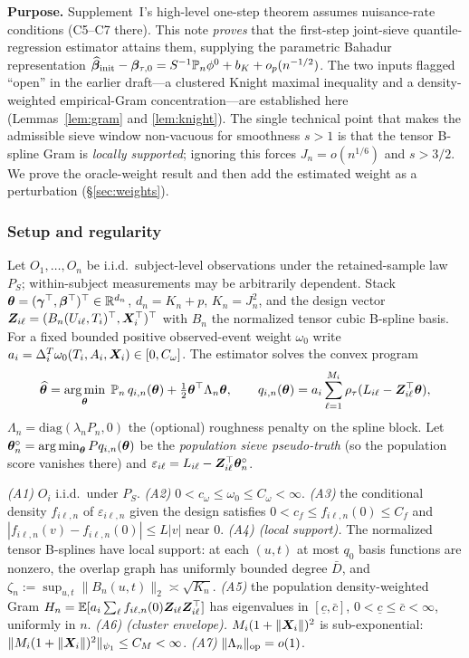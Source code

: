 

\noindent\textbf{Purpose.} Supplement~I's high-level one-step theorem assumes
nuisance-rate conditions (C5--C7 there). This note \emph{proves} that the
first-step joint-sieve quantile-regression estimator attains them, supplying the
parametric Bahadur representation $\widehat{\bm{\beta}}_{\rm init}-\bm{\beta}_{\tau,0}
=S^{-1}\mathbb{P}_n\phi^0+b_{K}+o_p(n^{-1/2})$. The two inputs flagged ``open'' in the
earlier draft---a clustered Knight maximal inequality and a density-weighted
empirical-Gram concentration---are established here (Lemmas~\ref{lem:gram} and
\ref{lem:knight}). The single technical point that makes the admissible sieve
window non-vacuous for smoothness $s>1$ is that the tensor B-spline Gram is
\emph{locally supported}; ignoring this forces $J_n=o(n^{1/6})$ and $s>3/2$.
We prove the oracle-weight result and then add the estimated weight as a
perturbation (\S\ref{sec:weights}).

\subsubsection{Setup and regularity}\label{sec:setup}
Let $O_1,\dots,O_n$ be i.i.d.\ subject-level observations under the
retained-sample law $P_S$; within-subject measurements may be arbitrarily
dependent. Stack $\bm{\theta}=(\bm{\gamma}^\top,\bm{\beta}^\top)^\top\in\mathbb R^{d_n}$,
$d_n=K_n+p$, $K_n=J_n^2$, and the design vector
$\bm{Z}_{i\ell}=(B_n(U_{i\ell},T_i)^\top,\bm{X}_i^\top)^\top$ with $B_n$ the normalized
tensor cubic B-spline basis. For a fixed bounded positive observed-event weight
$\omega_0$ write $a_i=\Delta_i^T\omega_0(T_i,A_i,\bm{X}_i)\in[0,C_\omega]$. The
estimator solves the convex program
\[
\widehat{\bm{\theta}}=\operatorname*{arg\,min}_{\bm{\theta}}\;\mathbb{P}_n\,q_{i,n}(\bm{\theta})+\tfrac12\bm{\theta}^\top\Lambda_n\bm{\theta},
\qquad q_{i,n}(\bm{\theta})=a_i\sum_{\ell=1}^{M_i}\rho_\tau(L_{i\ell}
-\bm{Z}_{i\ell}^\top\bm{\theta}),
\]
$\Lambda_n=\mathrm{diag}(\lambda_n P_n,0)$ the (optional) roughness penalty on the
spline block. Let $\bm{\theta}_n^\circ=\operatorname*{arg\,min}_{\bm{\theta}}Pq_{i,n}(\bm{\theta})$ be the
\emph{population sieve pseudo-truth} (so the population score vanishes there) and
$\varepsilon_{i\ell}=L_{i\ell}-\bm{Z}_{i\ell}^\top\bm{\theta}_n^\circ$.

\begin{condition}[Regularity]\label{cond:reg}
\emph{(A1)} $O_i$ i.i.d.\ under $P_S$. \emph{(A2)} $0<c_\omega\le\omega_0\le
C_\omega<\infty$. \emph{(A3)} the conditional density $f_{i\ell,n}$ of
$\varepsilon_{i\ell,n}$ given the design satisfies $0<c_f\le f_{i\ell,n}(0)\le
C_f$ and $|f_{i\ell,n}(v)-f_{i\ell,n}(0)|\le L|v|$ near $0$. \emph{(A4) (local
support).} The normalized tensor B-splines have local support: at each $(u,t)$
at most $q_0$ basis functions are nonzero, the overlap graph has uniformly
bounded degree $\bar D$, and $\zeta_n:=\sup_{u,t}\|B_n(u,t)\|_2\asymp\sqrt{K_n}$.
\emph{(A5)} the population density-weighted Gram
$H_n=\mathbb{E}[a_i\sum_\ell f_{i\ell,n}(0)\bm{Z}_{i\ell}\bm{Z}_{i\ell}^\top]$ has eigenvalues in
$[\underline c,\bar c]$, $0<\underline c\le\bar c<\infty$, uniformly in $n$.
\emph{(A6) (cluster envelope).} $M_i(1+\|\bm{X}_i\|)^2$ is sub-exponential:
$\|M_i(1+\|\bm{X}_i\|)^2\|_{\psi_1}\le C_M<\infty$. \emph{(A7)}
$\|\Lambda_n\|_{\mathrm{op}}=o(1)$.
\end{condition}

